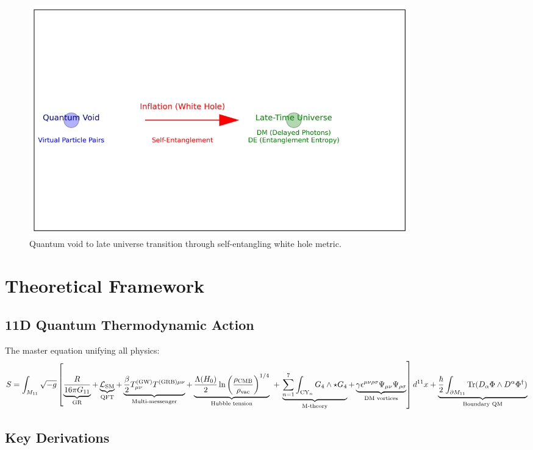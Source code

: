 \documentclass[12pt, a4paper]{article}
\begin{document}
\begin{figure}[h]
\centering
\includegraphics[width=0.8\textwidth]{white_hole_inflation.png}
\caption{Quantum void to late universe transition through self-entangling white hole metric.}
\end{figure}

\section{Theoretical Framework}

\subsection{11D Quantum Thermodynamic Action}
The master equation unifying all physics:
\begin{equation}
S = \int_{M_{11}} \sqrt{-g}\left[\underbrace{\frac{R}{16\pi G_{11}}}_{\text{GR}} + \underbrace{\mathcal{L}_{\text{SM}}}_{\text{QFT}} + \underbrace{\frac{\beta}{2}T_{\mu\nu}^{(\text{GW})}T^{(\text{GRB})\mu\nu}}_{\text{Multi-messenger}} + \underbrace{\frac{\Lambda(H_0)}{2}\ln\left(\frac{\rho_{\text{CMB}}}{\rho_{\text{vac}}}\right)^{1/4}}_{\text{Hubble tension}} \right. \\
+ \left. \underbrace{\sum_{n=1}^7\int_{\text{CY}_n}G_4\wedge\star G_4}_{\text{M-theory}} + \underbrace{\gamma\epsilon^{\mu\nu\rho\sigma}\Psi_{\mu\nu}\Psi_{\rho\sigma}}_{\text{DM vortices}} \right]d^{11}x + \underbrace{\frac{\hbar}{2}\int_{\partial M_{11}}\text{Tr}(D_\alpha\Phi\wedge D^\alpha\Phi^\dagger)}_{\text{Boundary QM}}
\end{equation}

\subsection{Key Derivations}
\end{document}
